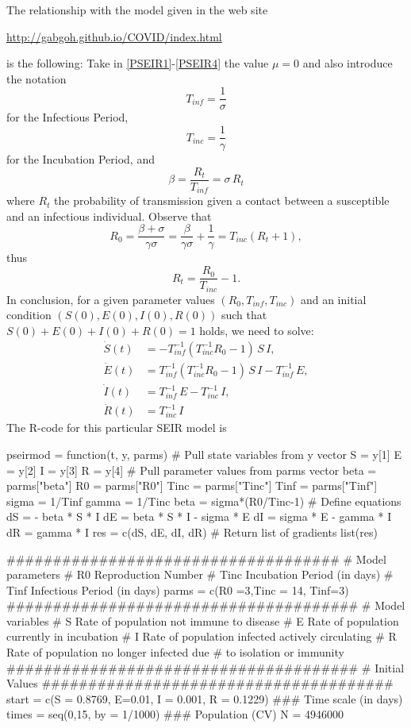 \documentclass[12pt]{article}\usepackage[]{graphicx}\usepackage[]{color}
\begin{document}
The relationship with the model given in the web site 
\begin{center}
\href{http://gabgoh.github.io/COVID/index.html}{http://gabgoh.github.io/COVID/index.html} 
\end{center}
is the following: Take in \eqref{PSEIR1}-\eqref{PSEIR4}
the value $\mu = 0$ and also introduce the notation
$$
T_{inf} = \frac{1}{\sigma}
$$
for the Infectious Period,
$$
T_{inc} = \frac{1}{\gamma}
$$
for the Incubation Period, and
$$
\beta = \frac{R_t}{T_{inf}} = \sigma \, R_t
$$
where $R_t$ the probability of transmission given a contact between a 
susceptible and an infectious individual. Observe that
$$
R_0 =  \frac{\beta + \sigma}{\gamma \sigma } = \frac{\beta}{\gamma \sigma} + \frac{1}{\gamma}
= T_{inc}(R_t+1),
$$
thus
$$
R_t = \frac{R_0}{T_{inc}} -1.
$$
In conclusion, for a given parameter values $(R_0,T_{inf},T_{inc})$ and an initial condition $(S(0),E(0),I(0),R(0))$ such that $S(0)+E(0)+I(0)+R(0)=1$ holds, we need to solve:
\begin{align}
\dot{S}(t) & = - T_{inf}^{-1}(T_{inc}^{-1}R_0-1) \, S \,I, \label{aPSEIR1}\\
\dot{E}(t) & = T_{inf}^{-1}(T_{inc}^{-1}R_0-1) \, S \,I - T_{inf}^{-1} \, E, \label{aPSEIR2} \\
\dot{I}(t) & =  T_{inf}^{-1} \, E -  T_{inc}^{-1} \, I, \label{aPSEIR3}\\
\dot{R}(t) & =  T_{inc}^{-1} \, I \label{aPSEIR4}
\end{align}
The R-code for this particular SEIR model is

\begin{Schunk}
\begin{Sinput}
pseirmod = function(t, y, parms) {
  # Pull state variables from y vector
  S = y[1]
  E = y[2]
  I = y[3]
  R = y[4]
  # Pull parameter values from parms vector beta = parms["beta"]
  R0 = parms["R0"]
  Tinc = parms["Tinc"]
  Tinf = parms["Tinf"]
  sigma = 1/Tinf
  gamma = 1/Tinc
  beta = sigma*(R0/Tinc-1) 
  # Define equations
  dS = - beta * S * I
  dE = beta * S * I - sigma * E
  dI = sigma * E  - gamma * I 
  dR = gamma * I
  res = c(dS, dE, dI, dR)
  # Return list of gradients
  list(res)
}
\end{Sinput}
\end{Schunk}


\begin{Schunk}
\begin{Sinput}
####################################
# Model parameters
# R0   Reproduction Number 
# Tinc Incubation Period (in days)
# Tinf Infectious Period (in days)
parms = c(R0 =3,Tinc = 14, Tinf=3)
######################################
# Model variables
# S  Rate of population not immune to disease
# E  Rate of population currently in incubation
# I  Rate of population infected actively circulating
# R  Rate of population no longer infected due 
#    to isolation or immunity
######################################
# Initial Values
######################################
start = c(S = 0.8769, E=0.01, I = 0.001, R = 0.1229)
### Time scale (in days)
times = seq(0,15, by = 1/1000)
### Population (CV)
N = 4946000
\end{Sinput}
\end{Schunk}
\end{document}

